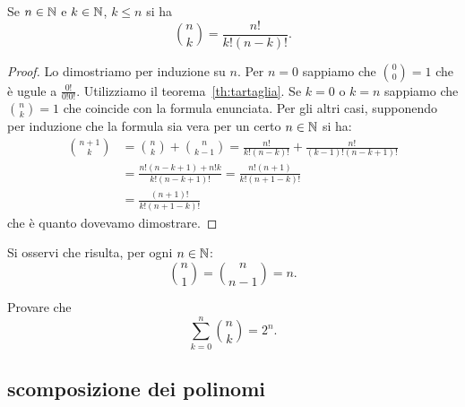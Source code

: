   \begin{theorem}
  \mymark{***}%
  Se $n\in {\mathbb N}$ e $k\in {\mathbb N}$, $k\le n$
  si ha 
  \[
  {n \choose k}  
  = \frac{n!}{k!(n-k)!}.  
  \]
  \end{theorem}
  \begin{proof}
  Lo dimostriamo per induzione su $n$.
  Per $n=0$ sappiamo che ${0 \choose 0} = 1$ che 
  è ugule a $\frac{0!}{0!0!}$.
  Utilizziamo il teorema~\ref{th:tartaglia}.
  Se $k=0$ o $k=n$ sappiamo che ${n \choose k}=1$ che coincide 
  con la formula enunciata. 
  Per gli altri casi, supponendo per induzione che la formula sia 
  vera per un certo $n\in {\mathbb N}$ si ha: 
  \begin{align*}
   {n+1 \choose k} 
   &= {n \choose k} + {n \choose k-1}
   =  \frac{n!}{k!(n-k)!} + \frac{n!}{(k-1)!(n-k+1)!} \\
   &= \frac{n!(n-k+1) + n! k}{k!(n-k+1)!}
   = \frac{n!(n+1)}{k!(n+1-k)!} \\
   &= \frac{(n+1)!}{k!(n+1-k)!}
  \end{align*}
  che è quanto dovevamo dimostrare.
\end{proof}

Si osservi che risulta, per ogni $n\in {\mathbb N}$:
\[
  {n \choose 1} = {n \choose n-1} = n.
\]
  
\begin{exercise}
  Provare che
  \[
   \sum_{k=0}^n {n \choose k} = 2^n.
  \]
\end{exercise}  


\subsection{scomposizione dei polinomi}


